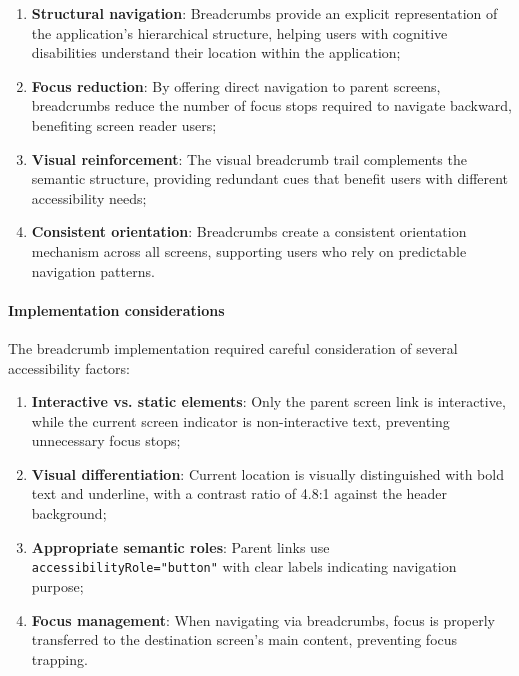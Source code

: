 \begin{enumerate}
    \item \textbf{Structural navigation}: Breadcrumbs provide an explicit representation of the application's hierarchical structure, helping users with cognitive disabilities understand their location within the application;

    \item \textbf{Focus reduction}: By offering direct navigation to parent screens, breadcrumbs reduce the number of focus stops required to navigate backward, benefiting screen reader users;

    \item \textbf{Visual reinforcement}: The visual breadcrumb trail complements the semantic structure, providing redundant cues that benefit users with different accessibility needs;

    \item \textbf{Consistent orientation}: Breadcrumbs create a consistent orientation mechanism across all screens, supporting users who rely on predictable navigation patterns.
\end{enumerate}

\paragraph{Implementation considerations}

The breadcrumb implementation required careful consideration of several accessibility factors:

\begin{enumerate}
    \item \textbf{Interactive vs. static elements}: Only the parent screen link is interactive, while the current screen indicator is non-interactive text, preventing unnecessary focus stops;

    \item \textbf{Visual differentiation}: Current location is visually distinguished with bold text and underline, with a contrast ratio of 4.8:1 against the header background;

    \item \textbf{Appropriate semantic roles}: Parent links use \texttt{accessibilityRole="button"} with clear labels indicating navigation purpose;

    \item \textbf{Focus management}: When navigating via breadcrumbs, focus is properly transferred to the destination screen's main content, preventing focus trapping.
\end{enumerate}

